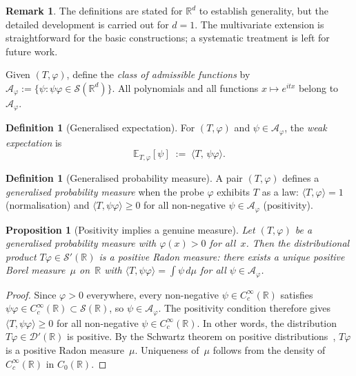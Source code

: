 \documentclass[12pt]{article}
\newtheorem{proposition}[theorem]{Proposition}
\theoremstyle{definition}
\newtheorem{definition}[theorem]{Definition}
\newtheorem{remark}[theorem]{Remark}
\newcommand{\R}{\mathbb{R}}
\newcommand{\E}{\mathbb{E}}
\begin{document}
\begin{remark}\label{rem:univariate-focus}
The definitions are stated for $\R^d$ to establish generality, but the detailed development is carried out for $d=1$.  The multivariate extension is straightforward for the basic constructions; a systematic treatment is left for future work.
\end{remark}

Given $(T,\varphi)$, define the \emph{class of admissible functions} by $\mathcal{A}_\varphi := \{ \psi : \psi\varphi \in \mathcal{S}(\R^d) \}$.  All polynomials and all functions $x\mapsto e^{itx}$ belong to $\mathcal{A}_\varphi$.

\begin{definition}[Generalised expectation]
For $(T,\varphi)$ and $\psi\in\mathcal{A}_\varphi$, the \emph{weak expectation} is
\[
\E_{T,\varphi}[\psi] \;:=\; \langle T,\,\psi\varphi\rangle.
\]
\end{definition}

\begin{definition}[Generalised probability measure]
A pair $(T,\varphi)$ defines a \emph{generalised probability measure} when the probe $\varphi$ exhibits $T$ as a law: $\langle T,\varphi\rangle = 1$ (normalisation) and $\langle T,\psi\varphi\rangle \geq 0$ for all non-negative $\psi\in\mathcal{A}_\varphi$ (positivity).
\end{definition}

\begin{proposition}[Positivity implies a genuine measure]\label{prop:positivity-measure}
Let $(T,\varphi)$ be a generalised probability measure with
$\varphi(x)>0$ for all~$x$.  Then the distributional product
$T\varphi\in\mathcal{S}'(\R)$ is a positive Radon measure: there
exists a unique positive Borel measure~$\mu$ on~$\R$ with
$\langle T,\psi\varphi\rangle = \int\psi\,d\mu$ for all
$\psi\in\mathcal{A}_\varphi$.
\end{proposition}

\begin{proof}
Since $\varphi>0$ everywhere, every non-negative $\psi\in C_c^\infty(\R)$
satisfies $\psi\varphi\in C_c^\infty(\R)\subset\mathcal{S}(\R)$, so
$\psi\in\mathcal{A}_\varphi$.  The positivity condition therefore gives
$\langle T,\psi\varphi\rangle\ge 0$ for all non-negative
$\psi\in C_c^\infty(\R)$.  In other words, the distribution
$T\varphi\in\mathcal{D}'(\R)$ is positive.  By the Schwartz theorem on
positive distributions~\cite[Thm.~2.1.7]{Hormander1990}, $T\varphi$ is a
positive Radon measure~$\mu$.  Uniqueness of~$\mu$ follows from the
density of $C_c^\infty(\R)$ in $C_0(\R)$.
\end{proof}
\end{document}

